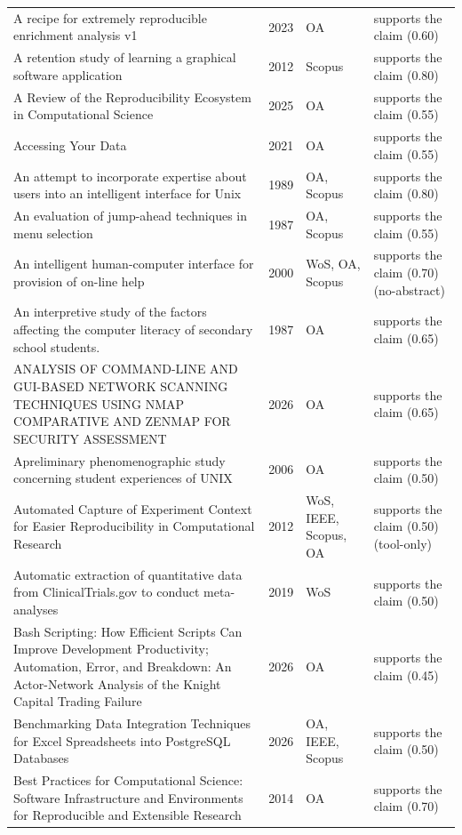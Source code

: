 \begin{longtable}{@{}%
  >{\raggedright\arraybackslash}p{}c%
  >{\raggedright\arraybackslash}p{}%
  >{\raggedright\arraybackslash}p{}@{}}
A recipe for extremely reproducible enrichment analysis v1 & 2023 & OA & supports the claim (0.60) \\
A retention study of learning a graphical software application & 2012 & Scopus & supports the claim (0.80) \\
A Review of the Reproducibility Ecosystem in Computational Science & 2025 & OA & supports the claim (0.55) \\
Accessing Your Data & 2021 & OA & supports the claim (0.55) \\
An attempt to incorporate expertise about users into an intelligent interface for Unix & 1989 & OA, Scopus & supports the claim (0.80) \\
An evaluation of jump-ahead techniques in menu selection & 1987 & OA, Scopus & supports the claim (0.55) \\
An intelligent human-computer interface for provision of on-line help & 2000 & WoS, OA, Scopus & supports the claim (0.70) (no-abstract) \\
An interpretive study of the factors affecting the computer literacy of secondary school students. & 1987 & OA & supports the claim (0.65) \\
ANALYSIS OF COMMAND-LINE AND GUI-BASED NETWORK SCANNING TECHNIQUES USING NMAP COMPARATIVE AND ZENMAP FOR SECURITY ASSESSMENT & 2026 & OA & supports the claim (0.65) \\
Apreliminary phenomenographic study concerning student experiences of UNIX & 2006 & OA & supports the claim (0.50) \\
Automated Capture of Experiment Context for Easier Reproducibility in Computational Research & 2012 & WoS, IEEE, Scopus, OA & supports the claim (0.50) (tool-only) \\
Automatic extraction of quantitative data from ClinicalTrials.gov to conduct meta-analyses & 2019 & WoS & supports the claim (0.50) \\
Bash Scripting: How Efficient Scripts Can Improve Development Productivity; Automation, Error, and Breakdown: An Actor-Network Analysis of the Knight Capital Trading Failure & 2026 & OA & supports the claim (0.45) \\
Benchmarking Data Integration Techniques for Excel Spreadsheets into PostgreSQL Databases & 2026 & OA, IEEE, Scopus & supports the claim (0.50) \\
Best Practices for Computational Science: Software Infrastructure and Environments for Reproducible and Extensible Research & 2014 & OA & supports the claim (0.70) \\

\end{longtable}
